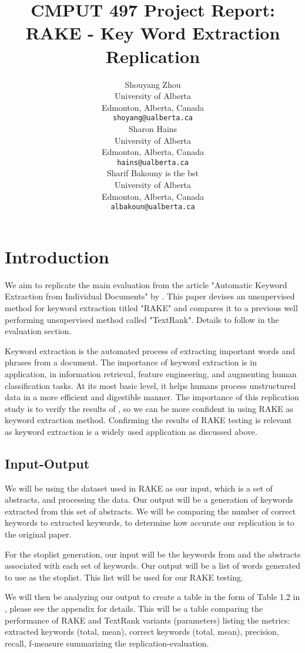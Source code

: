 \documentclass[11pt,a4paper]{article}
\title{CMPUT 497 Project Report: \\ RAKE - Key Word Extraction Replication}
\author{Shouyang Zhou \\
  University of Alberta \\
  Edmonton, Alberta, Canada \\
  {\tt shoyang@ualberta.ca} \\\And
  Sharon Hains \\
  University of Alberta \\
  Edmonton, Alberta, Canada \\
  {\tt hains@ualberta.ca} \\\And
  Sharif Bakouny is the bst \\
  University of Alberta \\
  Edmonton, Alberta, Canada \\
  {\tt albakoun@ualberta.ca} \\}
\date{}
\begin{document}
\maketitle

\section{Introduction}

We aim to replicate the main evaluation from the article "Automatic Keyword Extraction from Individual Documents" by \citet{1}. This paper devises an unsupervised method for keyword extraction titled "RAKE" and compares it to a previous well performing unsupervised method called "TextRank". Details to follow in the evaluation section.

Keyword extraction is the automated process of extracting important words and phrases from a document. The importance of keyword extraction is in application, in information retrieval, feature engineering, and augmenting human classification tasks. At its most basic level, it helps humans process unstructured data in a more efficient and digestible manner. The importance of this replication study is to verify the results of \citet{1}, so we can be more confident in using RAKE as keyword extraction method. Confirming the results of RAKE testing is relevant as keyword extraction is a widely used application as discussed above. 

\subsection{Input-Output}
We will be using the dataset used in RAKE as our input, which is a set of abstracts, and processing the data. Our output will be a generation of keywords extracted from this set of abstracts. We will be comparing the number of correct keywords to extracted keywords, to determine how accurate our replication is to the original paper.

For the stoplist generation, our input will be the keywords from \citep{hulth-2003-improved} and the abstracts associated with each set of keywords. Our output will be a list of words generated to use as the stoplist. This list will be used for our RAKE testing. 

We will then be analyzing our output to create a table in the form of Table 1.2 in \citet{1}, please see the appendix for details. This will be a table comparing the performance of RAKE and TextRank variants (parameters) listing the metrics: extracted keywords (total, mean), correct keywords (total, mean), precision, recall, f-measure summarizing the replication-evaluation. 
\end{document}
